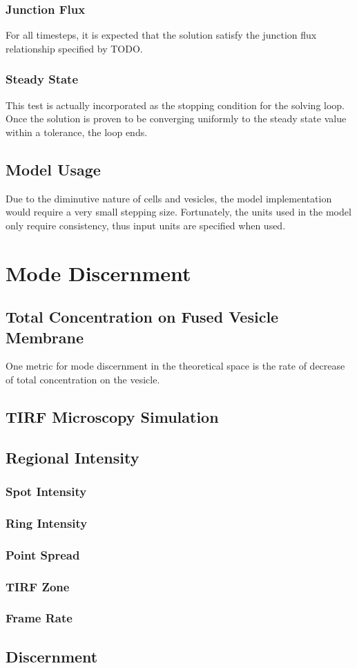 \documentclass{report}
\begin{document}
\section{Junction Flux}
For all timesteps, it is expected that the solution satisfy the junction flux relationship specified by TODO.

\section{Steady State}
This test is actually incorporated as the stopping condition for the solving loop. Once the solution is proven to be converging uniformly to the steady state value within a tolerance, the loop ends.

\chapter{Model Usage}
Due to the diminutive nature of cells and vesicles, the model implementation would require a very small stepping size. Fortunately, the units used in the model only require consistency, thus input units are specified when used.

\part{Mode Discernment}
\chapter{Total Concentration on Fused Vesicle Membrane}
One metric for mode discernment in the theoretical space is the rate of decrease of total concentration on the vesicle.

\chapter{TIRF Microscopy Simulation}
\chapter{Regional Intensity}
\section{Spot Intensity}
\section{Ring Intensity}
\section{Point Spread}
\section{TIRF Zone}
\section{Frame Rate}

\chapter{Discernment}
\end{document}
